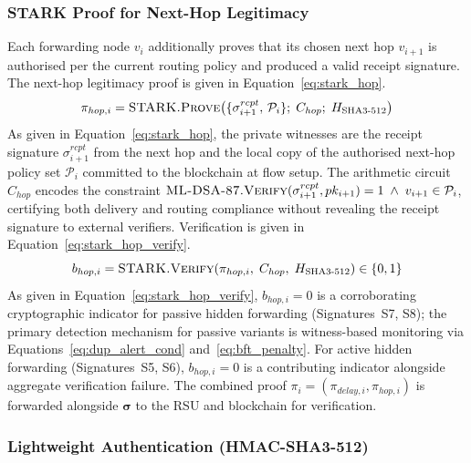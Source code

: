 \documentclass[12pt, a4paper]{report}
\begin{document}
\subsubsection{STARK Proof for Next-Hop Legitimacy}

Each forwarding node $v_i$ additionally proves that
its chosen next hop $v_{i+1}$ is authorised per the
current routing policy and produced a valid receipt
signature. The next-hop legitimacy proof is given in
Equation~\eqref{eq:stark_hop}.
\begin{equation}
\pi_{hop,i} = \textsc{STARK.Prove}\!\left(
\{\sigma^{rcpt}_{i+1},\, \mathcal{P}_i\};\;
C_{hop};\;
H_{\text{SHA3-512}}
\right)
\label{eq:stark_hop}
\end{equation}
As given in Equation~\eqref{eq:stark_hop}, the private
witnesses are the receipt signature
$\sigma^{rcpt}_{i+1}$ from the next hop and the
local copy of the authorised next-hop policy set
$\mathcal{P}_i$ committed to the blockchain at flow
setup. The arithmetic circuit $C_{hop}$ encodes the
constraint $\textsc{ML-DSA-87.Verify}(
\sigma^{rcpt}_{i+1}, pk_{i+1}) = 1 \;\land\;
v_{i+1} \in \mathcal{P}_i$, certifying both
delivery and routing compliance without revealing
the receipt signature to external verifiers.
Verification is given in
Equation~\eqref{eq:stark_hop_verify}.
\begin{equation}
b_{hop,i} = \textsc{STARK.Verify}\!\left(
\pi_{hop,i},\; C_{hop},\;
H_{\text{SHA3-512}}
\right) \in \{0, 1\}
\label{eq:stark_hop_verify}
\end{equation}
As given in Equation~\eqref{eq:stark_hop_verify},
$b_{hop,i} = 0$ is a corroborating cryptographic
indicator for passive hidden forwarding
(Signatures~S7, S8); the primary detection mechanism
for passive variants is witness-based monitoring
via Equations~\eqref{eq:dup_alert_cond}
and~\eqref{eq:bft_penalty}. For active hidden
forwarding (Signatures~S5, S6), $b_{hop,i} = 0$
is a contributing indicator alongside aggregate
verification failure. The combined proof
$\pi_i = (\pi_{delay,i}, \pi_{hop,i})$ is forwarded
alongside $\boldsymbol{\sigma}$ to the \ac{RSU}
and blockchain for verification.


\subsubsection{Lightweight Authentication (HMAC-SHA3-512)}
\end{document}
